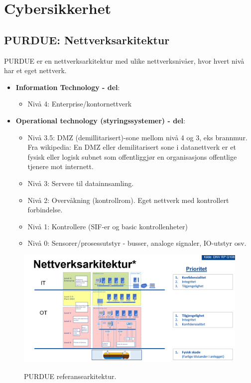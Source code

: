 \section{Cybersikkerhet}
\label{sec:cyber}


\subsection{PURDUE: Nettverksarkitektur}

PURDUE er en nettverksarkitektur med ulike nettverksnivåer, hvor hvert nivå har et eget nettverk. 

\begin{itemize}
    \item \textbf{Information Technology - del}:
    \begin{itemize}
        \item Nivå 4: Enterprise/kontornettverk
    \end{itemize}
    \item \textbf{Operational technology (styringssystemer) - del}:
    \begin{itemize}
        \item Nivå 3.5: DMZ (demillitarisert)-sone mellom nivå 4 og 3, eks brannmur. Fra wikipedia: En DMZ eller demilitarisert sone i datanettverk er et fysisk eller logisk subnet som offentliggjør en organisasjons offentlige tjenere mot internett. 
        \item Nivå 3: Servere til datainnsamling. 
        \item Nivå 2: Overvåkning (kontrollrom). Eget nettverk med kontrollert forbindelse.
        \item Nivå 1: Kontrollere (SIF-er og basic kontrollenheter)
        \item Nivå 0: Sensorer/prosessutstyr - busser, analoge signaler, IO-utstyr osv.
    \end{itemize}
\end{itemize}


\begin{figure}[H]
    \centering
        \includegraphics[width=\textwidth]{figures/cyber/purdue.PNG}\\
        \caption{PURDUE referansearkitektur.}
\end{figure}

